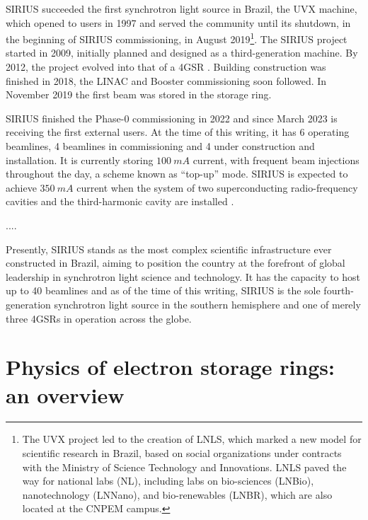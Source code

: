 SIRIUS succeeded the first synchrotron light source in Brazil, the UVX machine, which opened to users in 1997 and served the community until its shutdown, in the beginning of SIRIUS commissioning, in August 2019\footnote{The UVX project led to the creation of LNLS, which marked a new model for scientific research in Brazil, based on social organizations under contracts with the Ministry of Science Technology and Innovations. LNLS paved the way for national labs (NL), including labs on bio-sciences (LNBio), nanotechnology (LNNano), and bio-renewables (LNBR), which are also located at the CNPEM campus.}\cite{liu_synchrotron_2019}. The SIRIUS project started in 2009, initially planned and designed as a third-generation machine. By 2012, the project evolved into that of a 4GSR \cite{liu_synchrotron_2019}. Building construction was finished in 2018, the LINAC and Booster commissioning soon followed. In November 2019 the first beam was stored in the storage ring.

SIRIUS finished the Phase-0 commissioning in 2022 and since March 2023 is receiving the first external users. At the time of this writing,  it has 6 operating beamlines, 4 beamlines in commissioning and 4 under construction and installation. It is currently storing $100~\unit{mA}$ current, with frequent beam injections throughout the day, a scheme known as ``top-up'' mode. SIRIUS is expected to achieve $350~\unit{mA}$ current when the system of two superconducting radio-frequency cavities and the third-harmonic cavity are installed \cite{liu_status_2022,liu_status_2023}.


....



Presently, SIRIUS stands as the most complex scientific infrastructure ever constructed in Brazil, aiming to position the country at the forefront of global leadership in synchrotron light science and technology. It has the capacity to host up to 40 beamlines and as of the time of this writing, SIRIUS is the sole fourth-generation synchrotron light source in the southern hemisphere and one of merely three 4GSRs in operation across the globe.

\section*{Physics of electron storage rings: an overview}

